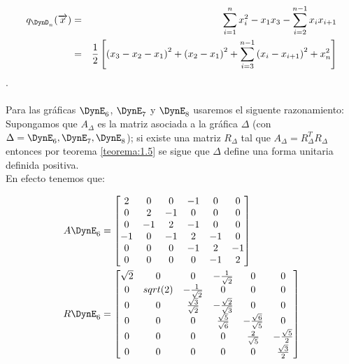 \begin{eqnarray*}
 q_{\DynD_{n}}(\overrightarrow{x}) &  =  & \sum_{i=1}^{n}x_{i}^{2} - x_{1}x_{3} -  \sum_{i=2}^{n-1} x_{i}x_{i+1}\\
 &  =  & \frac{1}{2}\left[\left(x_{3} - x_{2} - x_{1}\right)^{2} + \left(x_{2} - x_{1}\right)^{2} + \sum_{i=3}^{n-1}\left(x_{i} - x_{i+1}\right)^{2}  + x_{n}^{2}\right]
\end{eqnarray*}. 

\paragraph{}
Para las gráficas $\DynE_{6}$, $\DynE_{7}$ y $\DynE_{8}$ usaremos el siguente razonamiento:\\
Supongamos que $A_{\Delta}$ es la matriz asociada a la gráfica $\Delta$ (con $\Delta = \DynE_{6},\DynE_{7},\DynE_{8}$); si existe una matriz $R_{\Delta}$ tal que $A_{\Delta} = R_{\Delta}^{T}R_{\Delta}$ entonces por teorema \ref{teorema:1.5} se sigue que $\Delta$ define una forma unitaria definida positiva.\\
En efecto tenemos que:

\begin{align*}
 A\DynE_{6} &  =  \begin{bmatrix}
 2 & 0 & 0 & -1 & 0 & 0\\
 0 & 2 & -1 & 0 & 0 & 0\\
 0 & -1 & 2& -1 & 0 & 0\\
 -1 & 0 & -1 & 2 & -1 & 0\\
 0 & 0 & 0 & -1 & 2 & -1\\
 0 & 0 & 0 & 0 & -1 & 2\\
 \end{bmatrix}\\
 R\DynE_{6} &  =   \begin{bmatrix}
 \sqrt{2} & 0 & 0 & -\frac{1}{\sqrt{2}} & 0 & 0\\
 0 & sqrt(2) & - \frac{1}{\sqrt{2}}& 0 & 0 & 0\\
 0 & 0 & \frac{\sqrt{3}}{\sqrt{2}} & -\frac{\sqrt{2}}{\sqrt{3}} & 0 & 0\\
 0 & 0 & 0 & \frac{\sqrt{5}}{\sqrt{6}} & -\frac{\sqrt{6}}{\sqrt{5}} & 0\\
 0 & 0 & 0 & 0 & \frac{2}{\sqrt{5}} & -\frac{\sqrt{5}}{2}\\
 0 & 0 & 0 & 0 & 0 & \frac{\sqrt{3}}{2}\\
 \end{bmatrix}
 \end{align*}\\

